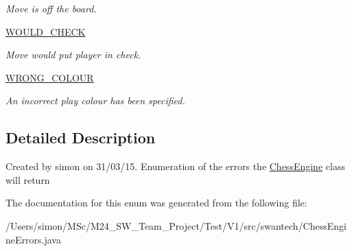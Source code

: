 \begin{DoxyCompactItemize}
\begin{DoxyCompactList}\small\item\em Move is off the board. \end{DoxyCompactList}\item 
\hypertarget{enumswantech_1_1_chess_engine_errors_a81e82842b33b2f3fc78c9872710f2a3a}{}\hyperlink{enumswantech_1_1_chess_engine_errors_a81e82842b33b2f3fc78c9872710f2a3a}{W\+O\+U\+L\+D\+\_\+\+C\+H\+E\+C\+K}\label{enumswantech_1_1_chess_engine_errors_a81e82842b33b2f3fc78c9872710f2a3a}

\begin{DoxyCompactList}\small\item\em Move would put player in check. \end{DoxyCompactList}\item 
\hypertarget{enumswantech_1_1_chess_engine_errors_a4c75ee89f5c8c4b661beb60f0a06f313}{}\hyperlink{enumswantech_1_1_chess_engine_errors_a4c75ee89f5c8c4b661beb60f0a06f313}{W\+R\+O\+N\+G\+\_\+\+C\+O\+L\+O\+U\+R}\label{enumswantech_1_1_chess_engine_errors_a4c75ee89f5c8c4b661beb60f0a06f313}

\begin{DoxyCompactList}\small\item\em An incorrect play colour has been specified. \end{DoxyCompactList}\end{DoxyCompactItemize}


\subsection{Detailed Description}
Created by simon on 31/03/15. Enumeration of the errors the \hyperlink{classswantech_1_1_chess_engine}{Chess\+Engine} class will return 

The documentation for this enum was generated from the following file\+:\begin{DoxyCompactItemize}
\item 
/\+Users/simon/\+M\+Sc/\+M24\+\_\+\+S\+W\+\_\+\+Team\+\_\+\+Project/\+Test/\+V1/src/swantech/Chess\+Engine\+Errors.\+java\end{DoxyCompactItemize}

